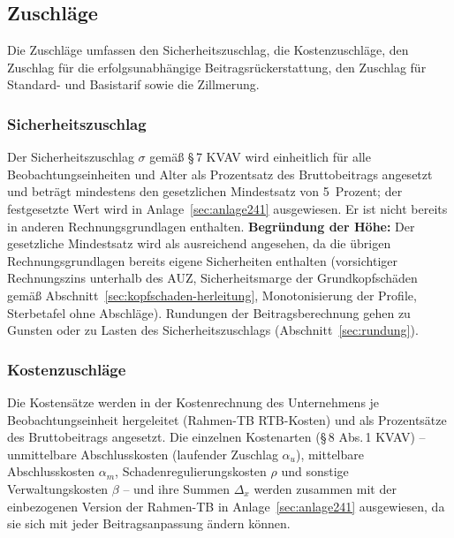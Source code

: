 \subsection{Zuschläge}\label{sec:zuschlaege}

Die Zuschläge umfassen den Sicherheitszuschlag, die Kostenzuschläge,
den Zuschlag für die erfolgsunabhängige Beitragsrückerstattung, den
Zuschlag für Standard- und Basistarif sowie die Zillmerung.

\subsubsection{Sicherheitszuschlag}\label{sec:sicherheitszuschlag}

Der Sicherheitszuschlag $\sigma$ gemäß \S\,7 KVAV wird einheitlich
für alle Beobachtungseinheiten und Alter als Prozentsatz des
Bruttobeitrags angesetzt und beträgt mindestens den gesetzlichen
Mindestsatz von 5~Prozent; der festgesetzte Wert wird in
Anlage~\ref{sec:anlage241} ausgewiesen. Er ist
nicht bereits in anderen Rechnungsgrundlagen enthalten.
\textbf{Begründung der Höhe:} Der gesetzliche Mindestsatz wird als
ausreichend angesehen, da die übrigen Rechnungsgrundlagen bereits
eigene Sicherheiten enthalten (vorsichtiger Rechnungszins unterhalb
des AUZ, Sicherheitsmarge der Grundkopfschäden gemäß
Abschnitt~\ref{sec:kopfschaden-herleitung}, Monotonisierung der
Profile, Sterbetafel ohne Abschläge). Rundungen der
Beitragsberechnung gehen zu Gunsten oder zu Lasten des
Sicherheitszuschlags (Abschnitt~\ref{sec:rundung}).

\subsubsection{Kostenzuschläge}\label{sec:kosten}

Die Kostensätze werden in der Kostenrechnung des Unternehmens je
Beobachtungseinheit hergeleitet (Rahmen-TB \mbox{RTB-Kosten}) und als
Prozentsätze des Bruttobeitrags angesetzt. Die einzelnen Kostenarten
(\S\,8 Abs.\,1 KVAV) -- unmittelbare Abschlusskosten (laufender Zuschlag
$\alpha_u$), mittelbare Abschlusskosten $\alpha_m$,
Schadenregulierungskosten $\rho$ und sonstige Verwaltungskosten $\beta$
-- und ihre Summen $\Delta_x$ werden zusammen mit der einbezogenen
Version der Rahmen-TB in Anlage~\ref{sec:anlage241} ausgewiesen, da sie
sich mit jeder Beitragsanpassung ändern können.

